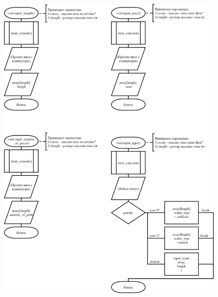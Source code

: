 \begin{figure}[!htp]
    \includegraphics[width=17cm]{../src/menu/add_element_end/add_element_end-2.png}
\end{figure}

